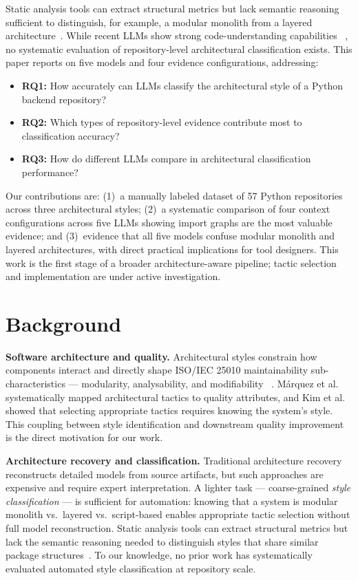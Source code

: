 \documentclass[runningheads]{llncs}
\begin{document}
Static analysis tools can extract structural metrics but lack semantic reasoning sufficient to distinguish, for example, a modular monolith from a layered architecture~\cite{lenarduzzi2023critical}. While recent LLMs show strong code-understanding capabilities~\cite{liu2025exploring} \cite{piao2025refactoring}, no systematic evaluation of repository-level architectural classification exists. This paper reports on five models and four evidence configurations, addressing: 

\begin{itemize}[nosep]
    \item \textbf{RQ1:} How accurately can LLMs classify the architectural style of a Python backend repository?
    \item \textbf{RQ2:} Which types of repository-level evidence contribute most to classification accuracy?
    \item \textbf{RQ3:} How do different LLMs compare in architectural classification performance?
\end{itemize}

Our contributions are: (1)~a manually labeled dataset of 57 Python repositories across three architectural styles; (2)~a systematic comparison of four context configurations across five LLMs showing import graphs are the most valuable evidence; and (3)~evidence that all five models confuse modular monolith and layered architectures, with direct practical implications for tool designers. This work is the first stage of a broader architecture-aware pipeline; tactic selection and implementation are under active investigation.
\section{Background}
\label{sec:background}

\textbf{Software architecture and quality.}
Architectural styles constrain how components interact and directly shape ISO/IEC 25010 maintainability sub-characteristics --- modularity, analysability, and modifiability~\cite{bass2021software} \cite{ISO25010}. M\'arquez et al.~\cite{marquez2022architectural} systematically mapped architectural tactics to quality attributes, and Kim et al.~\cite{kim2009qualitydriven} showed that selecting appropriate tactics requires knowing the system's style. This coupling between style identification and downstream quality improvement is the direct motivation for our work.

\textbf{Architecture recovery and classification.}
Traditional architecture recovery reconstructs detailed models from source artifacts, but such approaches are expensive and require expert interpretation. A lighter task --- coarse-grained \textit{style classification} --- is sufficient for automation: knowing that a system is modular monolith vs.\ layered vs.\ script-based enables appropriate tactic selection without full model reconstruction. Static analysis tools can extract structural metrics but lack the semantic reasoning needed to distinguish styles that share similar package structures~\cite{lenarduzzi2023critical}. To our knowledge, no prior work has systematically evaluated automated style classification at repository scale.
\end{document}
